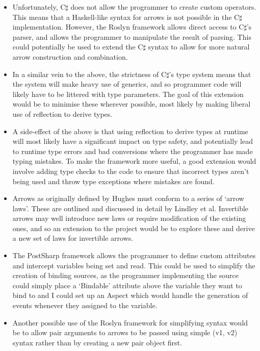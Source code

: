 \documentclass[12pt,a4]{article}
\begin{document}
		\begin{itemize}
			\item Unfortunately, C$\sharp$ does not allow the programmer to create custom operators. This means that a Haskell-like syntax for arrows is not possible in the C$\sharp$ implementation. However, the Roslyn framework allows direct access to C$\sharp$'s parser, and allows the programmer to manipulate the result of parsing. This could potentially be used to extend the C$\sharp$ syntax to allow for more natural arrow construction and combination.
			
			\item In a similar vein to the above, the strictness of C$\sharp$'s type system means that the system will make heavy use of generics, and so programmer code will likely have to be littered with type parameters. The goal of this extension would be to minimise these wherever possible, most likely by making liberal use of reflection to derive types.
			
			\item A side-effect of the above is that using reflection to derive types at runtime will most likely have a significant impact on type safety, and potentially lead to runtime type errors and bad conversions where the programmer has made typing mistakes. To make the framework more useful, a good extension would involve adding type checks to the code to ensure that incorrect types aren't being used and throw type exceptions where mistakes are found.
			
			\item Arrows as originally defined by Hughes\cite{hughes98} must conform to a series of `arrow laws'. These are outlined and discussed in detail by Lindley et al\cite{lindley08}. Invertible arrows may well introduce new laws or require modification of the existing ones, and so an extension to the project would be to explore these and derive a new set of laws for invertible arrows.
			
			\item The PostSharp\cite{postsharp} framework allows the programmer to define custom attributes and intercept variables being set and read. This could be used to simplify the creation of binding sources, as the programmer implementing the source could simply place a `Bindable' attribute above the variable they want to bind to and I could set up an Aspect which would handle the generation of events whenever they assigned to the variable.
			
			\item Another possible use of the Roslyn framework for simplifying syntax would be to allow pair arguments to arrows to be passed using simple (v1, v2) syntax rather than by creating a new pair object first.
		\end{itemize}
\end{document}
